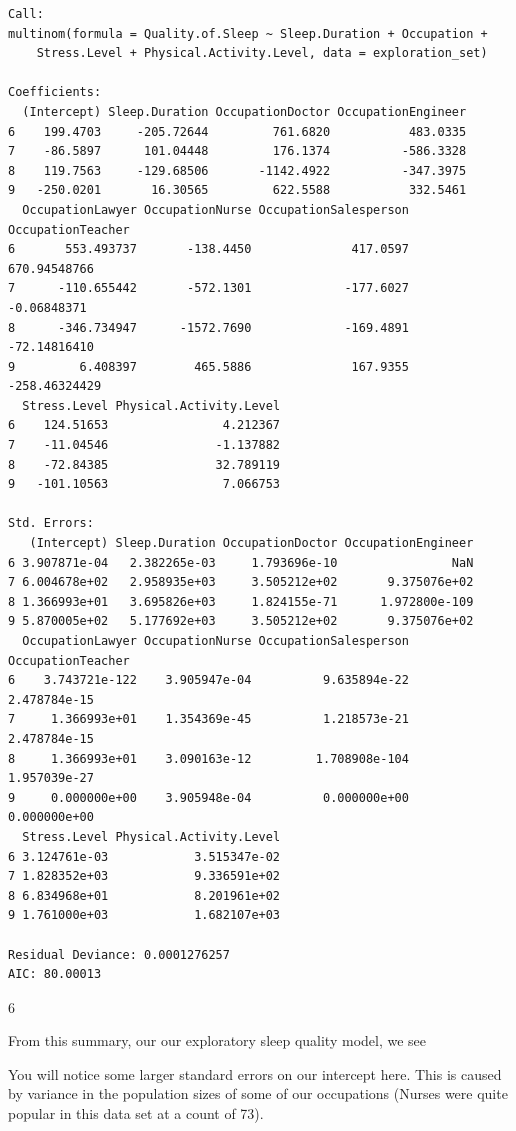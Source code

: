 \documentclass[
  letterpaper,
  DIV=11,
  numbers=noendperiod]{scrartcl}
\begin{document}
\begin{verbatim}
Call:
multinom(formula = Quality.of.Sleep ~ Sleep.Duration + Occupation + 
    Stress.Level + Physical.Activity.Level, data = exploration_set)

Coefficients:
  (Intercept) Sleep.Duration OccupationDoctor OccupationEngineer
6    199.4703     -205.72644         761.6820           483.0335
7    -86.5897      101.04448         176.1374          -586.3328
8    119.7563     -129.68506       -1142.4922          -347.3975
9   -250.0201       16.30565         622.5588           332.5461
  OccupationLawyer OccupationNurse OccupationSalesperson OccupationTeacher
6       553.493737       -138.4450              417.0597      670.94548766
7      -110.655442       -572.1301             -177.6027       -0.06848371
8      -346.734947      -1572.7690             -169.4891      -72.14816410
9         6.408397        465.5886              167.9355     -258.46324429
  Stress.Level Physical.Activity.Level
6    124.51653                4.212367
7    -11.04546               -1.137882
8    -72.84385               32.789119
9   -101.10563                7.066753

Std. Errors:
   (Intercept) Sleep.Duration OccupationDoctor OccupationEngineer
6 3.907871e-04   2.382265e-03     1.793696e-10                NaN
7 6.004678e+02   2.958935e+03     3.505212e+02       9.375076e+02
8 1.366993e+01   3.695826e+03     1.824155e-71      1.972800e-109
9 5.870005e+02   5.177692e+03     3.505212e+02       9.375076e+02
  OccupationLawyer OccupationNurse OccupationSalesperson OccupationTeacher
6    3.743721e-122    3.905947e-04          9.635894e-22      2.478784e-15
7     1.366993e+01    1.354369e-45          1.218573e-21      2.478784e-15
8     1.366993e+01    3.090163e-12         1.708908e-104      1.957039e-27
9     0.000000e+00    3.905948e-04          0.000000e+00      0.000000e+00
  Stress.Level Physical.Activity.Level
6 3.124761e-03            3.515347e-02
7 1.828352e+03            9.336591e+02
8 6.834968e+01            8.201961e+02
9 1.761000e+03            1.682107e+03

Residual Deviance: 0.0001276257 
AIC: 80.00013 
\end{verbatim}

6

From this summary, our our exploratory sleep quality model, we see

You will notice some larger standard errors on our intercept here. This
is caused by variance in the population sizes of some of our occupations
(Nurses were quite popular in this data set at a count of 73).
\end{document}
